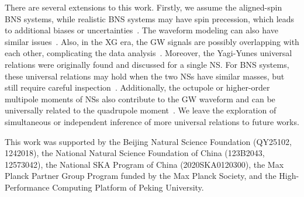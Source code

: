 \documentclass[a4paper,11pt]{article}
\begin{document}
There are several extensions to this work. Firstly, we assume the aligned-spin BNS systems, while
realistic BNS systems may have spin precession, which leads to additional
biases or uncertainties~\cite{Williamson:2017evr}. The waveform modeling can
also have similar issues~\cite{Purrer:2019jcp,Gamba:2020wgg}. 
Also, in the XG era, the GW signals are possibly overlapping with each
other, complicating the data analysis~\cite{Pizzati:2021apa, Samajdar:2021egv,
Wang:2023ldq, Johnson:2024foj, Wang:2025ckw}.
Moreover, the Yagi-Yunes universal relations were originally found and discussed
for a single NS. For BNS systems, these universal relations may hold when the
two NSs have similar masses, but still require careful
inspection~\cite{Shao:2022koz, Saffer:2021gak}. Additionally, the octupole or
higher-order multipole moments of NSs also contribute to the GW waveform and can
be universally related to the quadrupole moment~\cite{Yagi_2017,Abac:2023ujg}.
We leave the exploration of simultaneous or independent inference of more
universal relations to future works.

\acknowledgments

This work was supported by the Beijing Natural Science Foundation (QY25102,
1242018), the National Natural Science Foundation of China (123B2043, 12573042),
the National SKA Program of China (2020SKA0120300), the Max Planck Partner Group
Program funded by the Max Planck Society, and the High-Performance Computing
Platform of Peking University. 




% 

\end{document}
